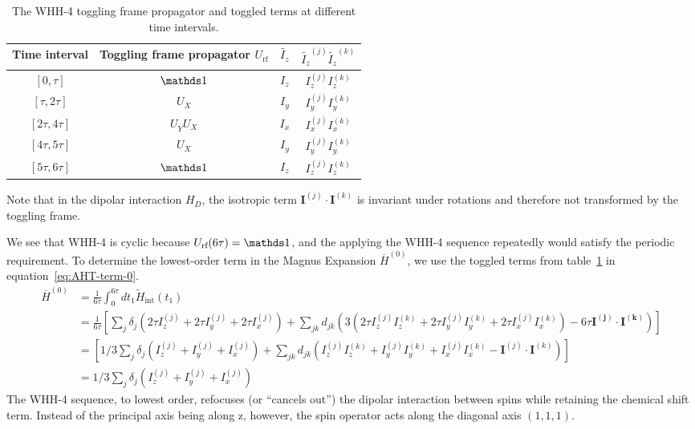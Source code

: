 \begin{table}[H]
    \centering
    \caption{The WHH-4 toggling frame propagator and toggled terms at different time intervals.}
    \label{tab:WHH-4}
    \begin{tabular}{c c c c}
        Time interval & Toggling frame propagator $U_{\text{rf}}$ & $\widetilde{I_z}$ & $\widetilde{I_z}^{(j)}\widetilde{I_z}^{(k)}$ \\
        \hline
        $[0, \tau]$ & $\identity$ & $I_z$ & $I_z^{(j)}I_z^{(k)}$ \\
        $[\tau, 2\tau]$ & $U_X$ & $I_y$ & $I_y^{(j)}I_y^{(k)}$ \\
        $[2\tau, 4\tau]$ & $U_{\overline{Y}} U_X$ & $I_x$ & $I_x^{(j)}I_x^{(k)}$ \\
        $[4\tau, 5\tau]$ & $U_X$ & $I_y$ & $I_y^{(j)}I_y^{(k)}$ \\
        $[5\tau, 6\tau]$ & $\identity$ & $I_z$ & $I_z^{(j)}I_z^{(k)}$ \\
    \end{tabular}
\end{table}

Note that in the dipolar interaction $H_D$, the isotropic term $\mathbf{I}^{(j)} \cdot \mathbf{I}^{(k)}$ is invariant under rotations and therefore not transformed by the toggling frame.

We see that WHH-4 is cyclic because $U_{\text{rf}}(6\tau) = \identity$, and the applying the WHH-4 sequence repeatedly would satisfy the periodic requirement. To determine the lowest-order term in the Magnus Expansion $\overline{H}^{(0)}$, we use the toggled terms from table~\ref{tab:WHH-4} in equation~\ref{eq:AHT-term-0}.
\begin{align*}
    \overline{H}^{(0)} &= \frac{1}{6\tau} \int_0^{6\tau} dt_1
    \widetilde{H}_{\text{int}}(t_1) \\
    &= \frac{1}{6\tau} \left[
        \sum_j \delta_j \left(2\tau I_z^{(j)} + 2\tau I_y^{(j)} + 2\tau I_x^{(j)} \right) +
        \sum_{jk} d_{jk} \left(3(
            2\tau I_z^{(j)}I_z^{(k)} + 2\tau I_y^{(j)}I_y^{(k)} + 2\tau I_x^{(j)}I_x^{(k)}
        ) - 6\tau \mathbf{I^{(j)}} \cdot \mathbf{I^{(k)}} \right)
    \right] \\
    &= \left[
        1/3 \sum_j \delta_j \left(I_z^{(j)} + I_y^{(j)} + I_x^{(j)} \right) +
        \sum_{jk} d_{jk} \left(I_z^{(j)}I_z^{(k)} + I_y^{(j)}I_y^{(k)} + I_x^{(j)}I_x^{(k)} - \mathbf{I}^{(j)} \cdot \mathbf{I}^{(k)} \right)
    \right] \\
    &= 1/3 \sum_j \delta_j \left(I_z^{(j)} + I_y^{(j)} + I_x^{(j)} \right)
\end{align*}
The WHH-4 sequence, to lowest order, refocuses (or ``cancels out'') the dipolar interaction between spins while retaining the chemical shift term. Instead of the principal axis being along z, however, the spin operator acts along the diagonal axis $(1,1,1)$.

